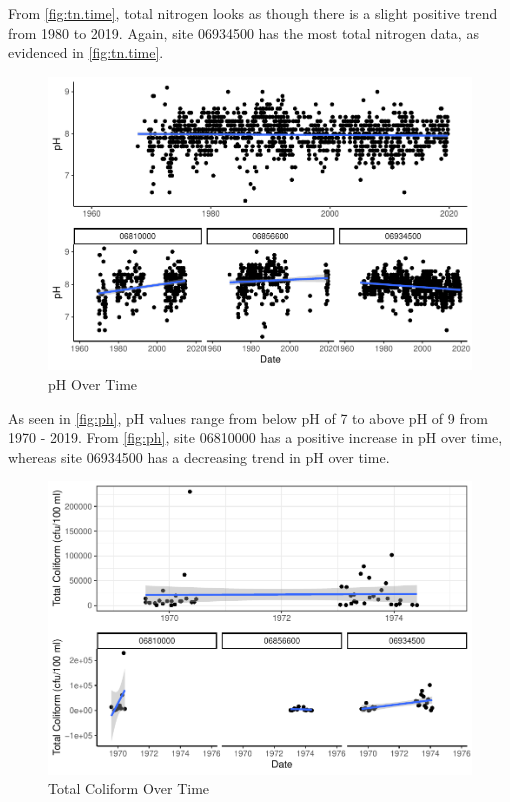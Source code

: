 \documentclass[12pt,]{article}
\begin{document}
From \autoref{fig:tn.time}, total nitrogen looks as though there is a
slight positive trend from 1980 to 2019. Again, site 06934500 has the
most total nitrogen data, as evidenced in \autoref{fig:tn.time}.

\begin{figure}
\centering
\includegraphics{Project_Template_files/figure-latex/ph-1.pdf}
\caption{\label{fig:ph}pH Over Time}
\end{figure}

As seen in \autoref{fig:ph}, pH values range from below pH of 7 to above
pH of 9 from 1970 - 2019. From \autoref{fig:ph}, site 06810000 has a
positive increase in pH over time, whereas site 06934500 has a
decreasing trend in pH over time.

\begin{figure}
\centering
\includegraphics{Project_Template_files/figure-latex/tc.time-1.pdf}
\caption{\label{fig:tc.time}Total Coliform Over Time}
\end{figure}
\end{document}
